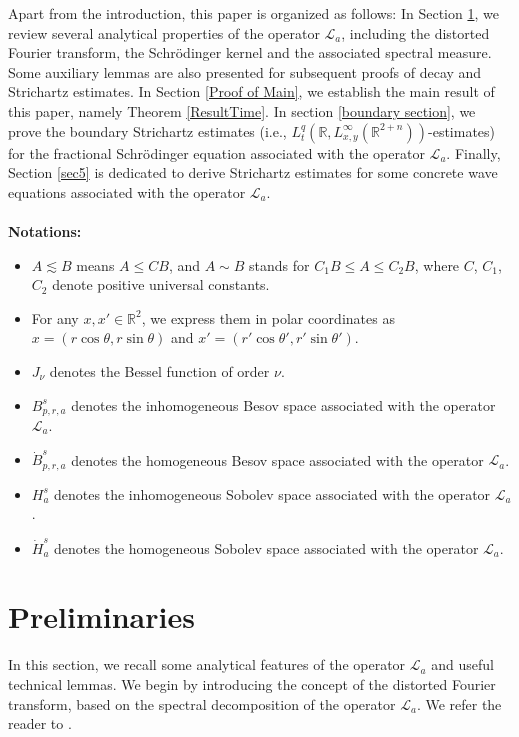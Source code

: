 \documentclass[a4paper,11pt, reqno]{amsart}
\numberwithin{equation}{section}
\theoremstyle{plain}
\theoremstyle{definition}
\theoremstyle{remark}
\begin{document}
Apart from the introduction, this paper is organized as follows: In Section \ref{sec2}, we review several analytical properties of the operator $\mathcal{L}_a$, including the distorted Fourier transform, the Schr\"odinger kernel and the associated spectral measure. Some auxiliary lemmas are also presented for subsequent proofs of decay and Strichartz estimates. In Section \ref{Proof of Main}, we establish the main result of this paper, namely Theorem \ref{ResultTime}. In section \ref{boundary section}, we prove the boundary Strichartz estimates (i.e., $L_t^q(\mathbb{R},L_{x,y}^\infty(\mathbb{R}^{2+n}))$-estimates)  for the fractional Schr\"{o}dinger equation associated with the operator $\mathcal{L}_a$. Finally, Section \ref{sec5} is dedicated to derive
Strichartz estimates for some concrete wave equations associated with the operator $\mathcal{L}_a$. \\\\

\noindent \textbf{Notations:}
\begin{itemize}
\item  $A\lesssim B$ means $A\leqslant C B$, and $A\sim B$ stands for $C_1B\leq A\leq C_2B$, where $C$, $C_1$, $C_2$ denote positive universal constants.
\item  For any $x, x'\in\mathbb{R}^2$, we express them in polar coordinates as $x=(r\cos \theta,r\sin\theta)$ and $x'=(r'\cos \theta',r'\sin\theta')$.
\item $J_\nu$ denotes the Bessel
function of order $\nu.$ 
\item $B^s_{p,r,a}$ denotes the inhomogeneous Besov space associated with the operator $\mathcal{L}_a$.
\item $\dot{B}^s_{p,r,a}$ denotes the homogeneous Besov space associated  with the operator $\mathcal{L}_a$.
\item $H^s_a$ denotes the inhomogeneous Sobolev space associated with the operator $\mathcal{L}_a$.
\item $\dot{H}^s_a$ denotes the homogeneous Sobolev space associated with the operator $\mathcal{L}_a$.
\end{itemize}

\section{Preliminaries}\label{sec2}
In this section, we recall some analytical features of the operator $\mathcal{L}_a$ and useful technical lemmas. We begin by introducing the concept of the distorted Fourier transform, based on the spectral decomposition of the operator $\mathcal{L}_a$. We refer the reader to \cite{WXZZ, Zhang-Zhang}. 
\end{document}

